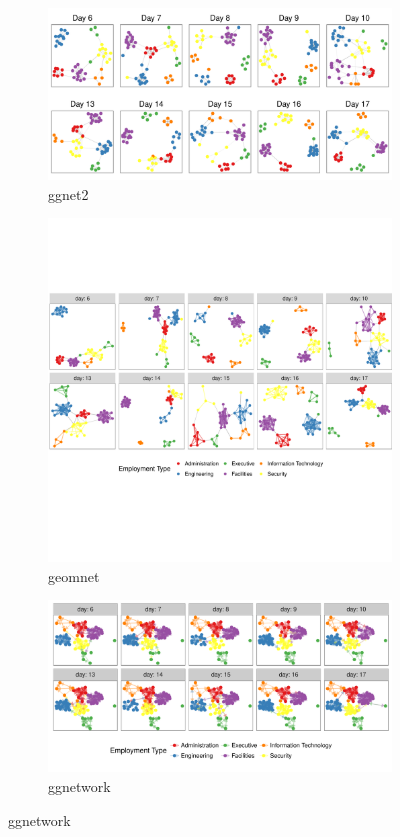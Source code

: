 \begin{figure}[hbt]
\begin{subfigure}[t]{\textwidth}
\caption{ggnet2}\label{email:ggnet2}
\includegraphics[width=\textwidth]{figure/email_facet_ggnet2-1.pdf}
\end{subfigure}
%
\begin{subfigure}[t]{\textwidth}
\caption{geomnet}
\includegraphics[width=\textwidth]{figure/email_facet_geom_net-1.pdf}
\end{subfigure}
%
\begin{subfigure}[t]{\textwidth}
\caption{ggnetwork}
\includegraphics[width=\textwidth]{figure/email_facet_ggnetwork-1.pdf}
\end{subfigure}


\end{figure}
